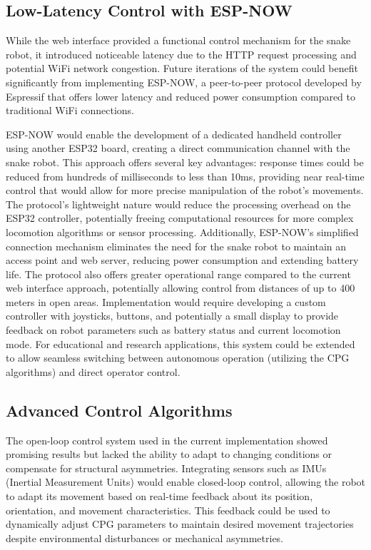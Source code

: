 \documentclass[12pt,a4paper]{report}
\begin{document}
\subsection{Low-Latency Control with ESP-NOW}
\label{subsec:esp_now_control}

While the web interface provided a functional control mechanism for the snake robot, it introduced noticeable latency due to the HTTP request processing and potential WiFi network congestion. Future iterations of the system could benefit significantly from implementing ESP-NOW, a peer-to-peer protocol developed by Espressif that offers lower latency and reduced power consumption compared to traditional WiFi connections.

ESP-NOW would enable the development of a dedicated handheld controller using another ESP32 board, creating a direct communication channel with the snake robot. This approach offers several key advantages: response times could be reduced from hundreds of milliseconds to less than 10ms, providing near real-time control that would allow for more precise manipulation of the robot's movements. The protocol's lightweight nature would reduce the processing overhead on the ESP32 controller, potentially freeing computational resources for more complex locomotion algorithms or sensor processing.
Additionally, ESP-NOW's simplified connection mechanism eliminates the need for the snake robot to maintain an access point and web server, reducing power consumption and extending battery life. The protocol also offers greater operational range compared to the current web interface approach, potentially allowing control from distances of up to 400 meters in open areas. Implementation would require developing a custom controller with joysticks, buttons, and potentially a small display to provide feedback on robot parameters such as battery status and current locomotion mode.
For educational and research applications, this system could be extended to allow seamless switching between autonomous operation (utilizing the CPG algorithms) and direct operator control.


\subsection{Advanced Control Algorithms}
\label{subsec:control_improvements}

The open-loop control system used in the current implementation showed promising results but lacked the ability to adapt to changing conditions or compensate for structural asymmetries. Integrating sensors such as IMUs (Inertial Measurement Units) would enable closed-loop control, allowing the robot to adapt its movement based on real-time feedback about its position, orientation, and movement characteristics. This feedback could be used to dynamically adjust CPG parameters to maintain desired movement trajectories despite environmental disturbances or mechanical asymmetries.
\end{document}
